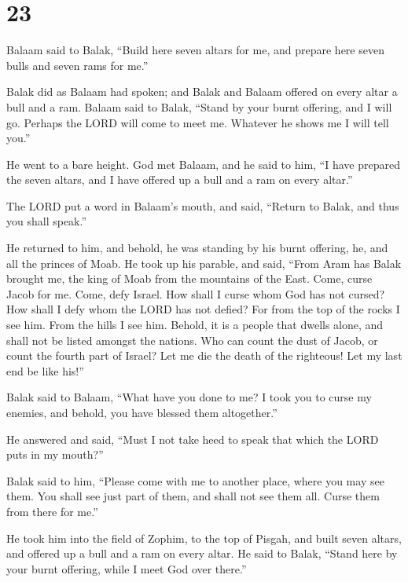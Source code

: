 \hypertarget{section-22}{%
\section{23}\label{section-22}}

 Balaam said to Balak, ``Build here seven altars for me,
and prepare here seven bulls and seven rams for me.''

 Balak did as Balaam had spoken; and Balak and Balaam
offered on every altar a bull and a ram.  Balaam said to
Balak, ``Stand by your burnt offering, and I will go. Perhaps the LORD
will come to meet me. Whatever he shows me I will tell you.''

He went to a bare height.  God met Balaam, and he said to
him, ``I have prepared the seven altars, and I have offered up a bull
and a ram on every altar.''

 The LORD put a word in Balaam's mouth, and said, ``Return
to Balak, and thus you shall speak.''

 He returned to him, and behold, he was standing by his
burnt offering, he, and all the princes of Moab.  He took
up his parable, and said, ``From Aram has Balak brought me, the king of
Moab from the mountains of the East. Come, curse Jacob for me. Come,
defy Israel.  How shall I curse whom God has not cursed?
How shall I defy whom the LORD has not defied?  For from
the top of the rocks I see him. From the hills I see him. Behold, it is
a people that dwells alone, and shall not be listed amongst the nations.
 Who can count the dust of Jacob, or count the fourth
part of Israel? Let me die the death of the righteous! Let my last end
be like his!''

 Balak said to Balaam, ``What have you done to me? I took
you to curse my enemies, and behold, you have blessed them altogether.''

 He answered and said, ``Must I not take heed to speak
that which the LORD puts in my mouth?''

 Balak said to him, ``Please come with me to another
place, where you may see them. You shall see just part of them, and
shall not see them all. Curse them from there for me.''

 He took him into the field of Zophim, to the top of
Pisgah, and built seven altars, and offered up a bull and a ram on every
altar.  He said to Balak, ``Stand here by your burnt
offering, while I meet God over there.''

